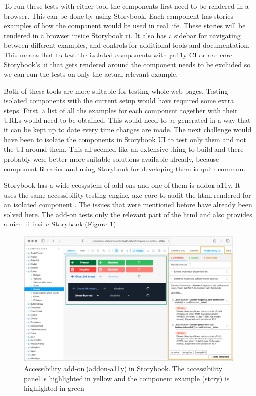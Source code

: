 \documentclass{master_thesis}
\begin{document}
To run these tests with either tool the components first need to be rendered in a browser. This can be done by using Storybook. Each component has stories – examples of how the component would be used in real life. These stories will be rendered in a browser inside Storybook \ac{ui}. It also has a sidebar for navigating between different examples, and controls for additional tools and documentation.
This means that to test the isolated components with pa11y CI or axe-core Storybook's \ac{ui} that gets rendered around the component needs to be excluded so we can run the tests on only the actual relevant example.

Both of these tools are more suitable for testing whole web pages. Testing isolated components with the current setup would have required some extra steps. First, a list of all the examples for each component together with their URLs would need to be obtained. This would need to be generated in a way that it can be kept up to date every time changes are made. The next challenge would have been to isolate the components in Storybook UI to test only them and not the UI around them. This all seemed like an extensive thing to build and there probably were better more suitable solutions available already, because component libraries and using Storybook for developing them is quite common.

Storybook has a wide ecosystem of add-ons and one of them is addon-a11y. It uses the same accessibility testing engine, axe-core to audit the \ac{html} rendered for an isolated component \citep{addon-a11y}. The issues that were mentioned before have already been solved here. The add-on tests only the relevant part of the \ac{html} and also provides a nice \ac{ui} inside Storybook (Figure \ref{fig:addon-a11y}).

\begin{figure}[h]
	\includegraphics[width=\textwidth]{img/addon-a11y.png}
	\caption{Accessibility add-on (addon-a11y) in Storybook. The accessibility panel is highlighted in yellow and the component example (story) is highlighted in green.}
	\label{fig:addon-a11y}
\end{figure}
\end{document}
